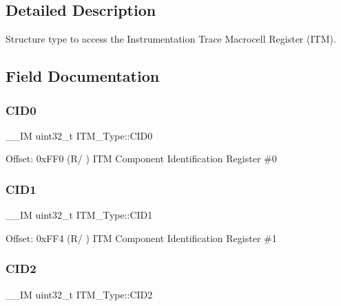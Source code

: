 \begin{DoxyCompactItemize}
\begin{tabbing}
\end{tabbing}\end{DoxyCompactItemize}


\subsection{Detailed Description}
Structure type to access the Instrumentation Trace Macrocell Register (I\+TM). 

\subsection{Field Documentation}
\mbox{\label{struct_i_t_m___type_a30bb2b166b1723867da4a708935677ba}} 
\subsubsection{\texorpdfstring{C\+I\+D0}{CID0}}
{\footnotesize\ttfamily \+\_\+\+\_\+\+IM uint32\+\_\+t I\+T\+M\+\_\+\+Type\+::\+C\+I\+D0}

Offset\+: 0x\+F\+F0 (R/ ) I\+TM Component Identification Register \#0 \mbox{\label{struct_i_t_m___type_ac40df2c3a6cef02f90b4e82c8204756f}} 
\subsubsection{\texorpdfstring{C\+I\+D1}{CID1}}
{\footnotesize\ttfamily \+\_\+\+\_\+\+IM uint32\+\_\+t I\+T\+M\+\_\+\+Type\+::\+C\+I\+D1}

Offset\+: 0x\+F\+F4 (R/ ) I\+TM Component Identification Register \#1 \mbox{\label{struct_i_t_m___type_a8000b92e4e528ae7ac4cb8b8d9f6757d}} 
\subsubsection{\texorpdfstring{C\+I\+D2}{CID2}}
{\footnotesize\ttfamily \+\_\+\+\_\+\+IM uint32\+\_\+t I\+T\+M\+\_\+\+Type\+::\+C\+I\+D2}

